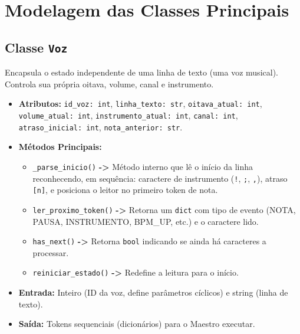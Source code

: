 \documentclass[12pt, a4paper]{article}
\begin{document}
\section{Modelagem das Classes Principais}

\subsection{Classe \texttt{Voz}}
Encapsula o estado independente de uma linha de texto (uma voz musical). Controla sua própria oitava, volume, canal e instrumento.
\begin{itemize}[leftmargin=2cm]
  \item \textbf{Atributos:} \texttt{id\_voz: int}, \texttt{linha\_texto: str}, \texttt{oitava\_atual: int}, \texttt{volume\_atual: int}, \texttt{instrumento\_atual: int}, \texttt{canal: int}, \texttt{atraso\_inicial: int}, \texttt{nota\_anterior: str}.
  \item \textbf{Métodos Principais:}
    \begin{itemize}
      \item \texttt{\_parse\_inicio()} \textbf{->} Método interno que lê o início da linha reconhecendo, em sequência: caractere de instrumento (\texttt{!}, \texttt{;}, \texttt{,}), atraso \texttt{[n]}, e posiciona o leitor no primeiro token de nota.
      \item \texttt{ler\_proximo\_token()} \textbf{->} Retorna um \texttt{dict} com tipo de evento (NOTA, PAUSA, INSTRUMENTO, BPM\_UP, etc.) e o caractere lido.
      \item \texttt{has\_next()} \textbf{->} Retorna \texttt{bool} indicando se ainda há caracteres a processar.
      \item \texttt{reiniciar\_estado()} \textbf{->} Redefine a leitura para o início.
    \end{itemize}
  \item \textbf{Entrada:} Inteiro (ID da voz, define parâmetros cíclicos) e string (linha de texto).
  \item \textbf{Saída:} Tokens sequenciais (dicionários) para o Maestro executar.
\end{itemize}
\end{document}
